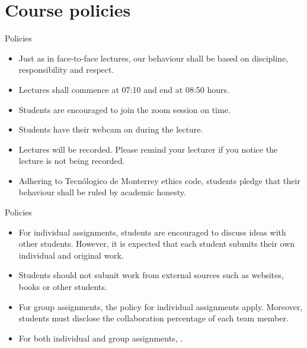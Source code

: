 \documentclass[]{slides}
\begin{document}
\section{Course policies}
\begin{frame}{Policies}
\begin{itemize}
  \item Just as in face-to-face lectures, our behaviour shall be based on discipline, responsibility and respect.
  \item Lectures shall commence at 07:10 and end at 08:50 hours.
  \item Students are encouraged to join the zoom session on time.
  \item Students  have their webcam on during the lecture.
  \item Lectures will be recorded. Please remind your lecturer if you notice the lecture is not being recorded.
  \item Adhering to Tecn\'ologico de Monterrey ethics code, students pledge that their behaviour shall be ruled by academic honesty.
\end{itemize}
\end{frame}

\begin{frame}{Policies}
\begin{itemize}
  \item For individual assignments, students are encouraged to discuss ideas with other students. 
  However, it is expected that each student submits their own individual and original work.
  \item Students should not submit work from external sources such as websites, books or other students.
  \item For group assignments, the policy for individual assignments apply. Moreover, students must
disclose the collaboration percentage of each team member.
  \item For both individual and group assignments, .
\end{itemize}
\end{frame}
\end{document}
